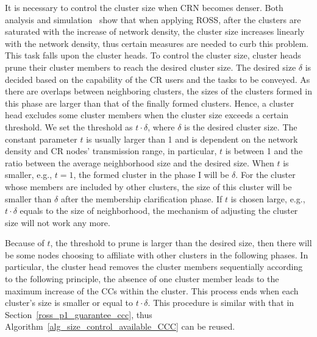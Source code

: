 \documentclass[times]{ettauth}
\newcommand{\eg}{e.g., }
\theoremstyle{mytheoremstyle}
\theoremstyle{mytheoremstyle}
\theoremstyle{mytheoremstyle}
\begin{document}
%
It is necessary to control the cluster size when CRN becomes denser.
Both analysis and simulation~\cite{2017arXiv170404828L} show that when applying ROSS, after the clusters are saturated with the increase of network density, the cluster size increases linearly with the network density, thus certain measures are needed to curb this problem.
This task falls upon the cluster heads.
To control the cluster size, cluster heads prune their cluster members to reach the desired cluster size.
The desired size $\delta$ is decided based on the capability of the CR users and the tasks to be conveyed.
As there are overlaps between neighboring clusters, the sizes of the clusters formed in this phase are larger than that of the finally formed clusters.
Hence, a cluster head excludes some cluster members when the cluster size exceeds a certain threshold.
We set the threshold as $t\cdot \delta$, where $\delta$ is the desired cluster size.
The constant parameter $t$ is usually larger than 1 and is dependent on the network density and CR nodes' transmission range, in particular, $t$ is between 1 and the ratio between the average neighborhood size and the desired size.
	When $t$ is smaller, \eg $t=1$, the formed cluster in the phase I will be $\delta$.
	For the cluster whose members are included by other clusters, the size of this cluster will be smaller than $\delta$ after the membership clarification phase.
	If $t$ is chosen large, \eg $t\cdot\delta$ equals to the size of neighborhood, the mechanism of adjusting the cluster size will not work any more.
	
Because of $t$, the threshold to prune is larger than the desired size, then there will be some nodes choosing to affiliate with other clusters in the following phases.
In particular, the cluster head removes the cluster members sequentially according to the following principle, the absence of one cluster member leads to the maximum increase of the CCs within the cluster.
This process ends when each cluster's size is smaller or equal to $t \cdot\delta$.
This procedure is similar with that in Section~\ref{ross_p1_guarantee_ccc}, thus Algorithm~\ref{alg_size_control_available_CCC} can be reused.
\end{document}
